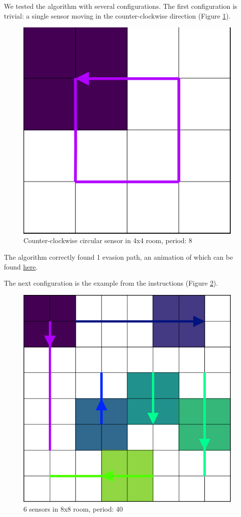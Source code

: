 \documentclass{article}
\begin{document}
We tested the algorithm with several configurations.
The first configuration is trivial: a single sensor moving in the counter-clockwise direction (Figure \ref{fig:ccw}).
\begin{figure}[H]
  \centering
  \includegraphics[width=0.7\linewidth]{ccw.png}
  \caption{Counter-clockwise circular sensor in 4x4 room, period: 8}
  \label{fig:ccw}
\end{figure}

The algorithm correctly found 1 evasion path, an animation of which can be found \href{https://github.com/MOj0/TDA_Evasion/blob/main/report/ccw.gif}{here}.

\bigskip

The next configuration is the example from the instructions (Figure \ref{fig:example}).
\begin{figure}[H]
  \centering
  \includegraphics[width=0.7\linewidth]{example.png}
  \caption{6 sensors in 8x8 room, period: 40}
  \label{fig:example}
\end{figure}
\end{document}
